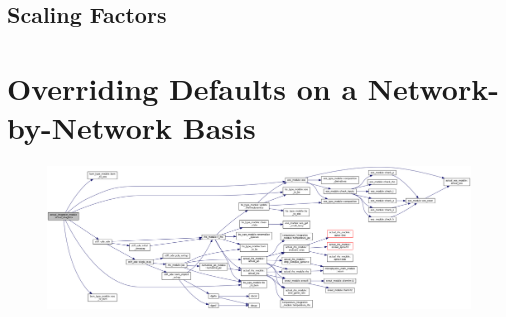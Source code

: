 \subsection{Scaling Factors}


\section{Overriding Defaults on a Network-by-Network Basis}


\begin{figure}
\centering
\includegraphics[width=\linewidth]{doxygen_network}
\end{figure}
